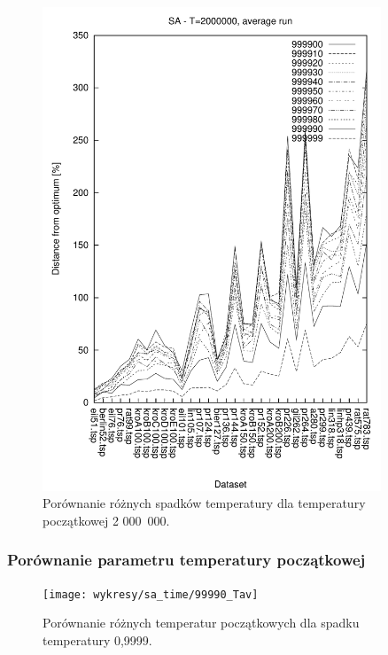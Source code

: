\begin{figure}
\begin{center}
\includegraphics[width=0.9\textwidth]{wykresy/sa/sa_2000000_av}
\end{center}
\caption{Porównanie różnych spadków temperatury dla temperatury początkowej 2 000~000.}
\label{sa_2000000_av}
\end{figure}

\subsubsection{Porównanie parametru temperatury początkowej}

\begin{figure}
\begin{center}
\texttt{[image: wykresy/sa\_time/99990\_Tav]}
\end{center}
\caption{Porównanie różnych temperatur początkowych dla spadku temperatury 0,9999.}
\label{999900_Tav}
\end{figure}

